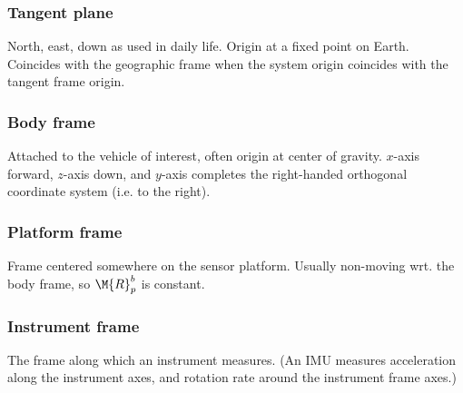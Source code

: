 \subsubsection{Tangent plane}
North, east, down as used in daily life. Origin at a fixed point on Earth. Coincides with the geographic frame when the system origin coincides with the tangent frame origin.

\subsubsection{Body frame}
Attached to the vehicle of interest, often origin at center of gravity. $x$-axis forward, $z$-axis down, and $y$-axis completes the right-handed orthogonal coordinate system (i.e. to the right).

\subsubsection{Platform frame}
Frame centered somewhere on the sensor platform. Usually non-moving wrt. the body frame, so $\M{R}_p^b$ is constant.

\subsubsection{Instrument frame}
The frame along which an instrument measures. (An IMU measures acceleration along the instrument axes, and rotation rate around the instrument frame axes.)